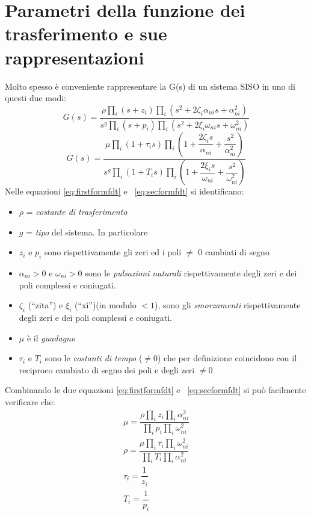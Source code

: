 \documentclass[a4paper]{report}
\begin{document}
\section{Parametri della funzione dei trasferimento e sue rappresentazioni}
Molto spesso \`e conveniente rappresentare la G(s) di un sistema SISO in
uno di questi due modi:
\begin{equation}\label{eq:firstformfdt}
  G(s)=\dfrac{\rho \prod_i(s+z_i) \prod_i(s^2+2 \zeta_i \alpha_{ni}s +
    \alpha^{2}_{ni})}{s^g \prod_i(s+p_i) \prod_i(s^2+2 \xi_i
    \omega_{ni}s + \omega^2_{ni})}
\end{equation}
\begin{equation}\label{eq:secformfdt}
  G(s)= \dfrac{\mu \prod_i(1 + \tau_i s) \prod_i\left(1+\dfrac{2 \zeta_i
      s}{\alpha_{ni}} + \dfrac{s^2}{\alpha^{2}_{ni}}\right)}{s^g
    \prod_i (1+T_i s) \prod_i\left(1+\dfrac{2 \xi_i s} {\omega_{ni}} +
    \dfrac{s^2}{\omega^2_{ni}}\right)}
\end{equation}
Nelle equazioni \ref{eq:firstformfdt} e ~\ref{eq:secformfdt} si identificano:
\begin{itemize}
\item $\rho$ = \emph{costante di trasferimento}
\item $g$ = \emph{tipo} del sistema. In particolare
\item $z_i$ e $p_i$ sono rispettivamente gli zeri ed i poli $\neq$ 0
  cambiati di segno
\item $\alpha_{ni}>0$ e $\omega_{ni}>0$ sono le \emph{pulsazioni
  naturali} rispettivamente degli zeri e dei poli complessi e coniugati.
\item $\zeta_i$ (``zita'') e $\xi_i$ (``x\`i'')(in modulo $< 1$), sono gli \emph{smorzamenti}
  rispettivamente degli zeri e dei poli complessi e coniugati.
\item $\mu$ \`e il \emph{guadagno}
\item $\tau_i$ e $T_i$ sono le \emph{costanti di tempo} ($\neq 0$) che
  per definizione coincidono con il reciproco cambiato di segno dei
  poli e degli zeri $\neq 0$
\end{itemize}
Combinando le due equazioni \ref{eq:firstformfdt} e
~\ref{eq:secformfdt} si pu\`o facilmente verificare che:
\begin{eqnarray}\label{eq:fdtparms}
  \mu=\dfrac{\rho \prod_iz_i\prod_i\alpha_{ni}^2}{\prod_ip_i\prod_i\omega^2_{ni}}\\
  \rho=\dfrac{\mu\prod_i\tau_i\prod_i\omega_{ni}^2}{\prod_iT_i\prod_i\alpha^2_{ni}}\\
  \tau_i=\dfrac{1}{z_i}\\
  T_i=\dfrac{1}{p_i}
\end{eqnarray}
\end{document}
